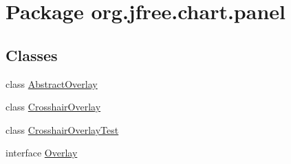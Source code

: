 \hypertarget{namespaceorg_1_1jfree_1_1chart_1_1panel}{}\section{Package org.\+jfree.\+chart.\+panel}
\label{namespaceorg_1_1jfree_1_1chart_1_1panel}
\subsection*{Classes}
\begin{DoxyCompactItemize}
\item 
class \mbox{\hyperlink{classorg_1_1jfree_1_1chart_1_1panel_1_1_abstract_overlay}{Abstract\+Overlay}}
\item 
class \mbox{\hyperlink{classorg_1_1jfree_1_1chart_1_1panel_1_1_crosshair_overlay}{Crosshair\+Overlay}}
\item 
class \mbox{\hyperlink{classorg_1_1jfree_1_1chart_1_1panel_1_1_crosshair_overlay_test}{Crosshair\+Overlay\+Test}}
\item 
interface \mbox{\hyperlink{interfaceorg_1_1jfree_1_1chart_1_1panel_1_1_overlay}{Overlay}}
\end{DoxyCompactItemize}
